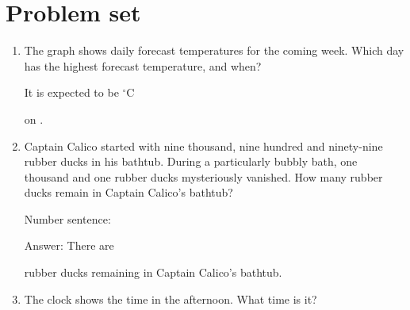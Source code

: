 \documentclass{tufte-book}
\begin{document}
\clearpage\section{Problem set }

\begin{enumerate}
  \item {}
  The graph shows daily forecast temperatures for the coming week.
  Which day has the highest forecast temperature, and when?\medskip
  
  It is expected to be \dotfill$^{\circ}$C\medskip\par
  on \dotfill\medskip.
  
\item
  Captain Calico started with nine thousand, nine hundred and
  ninety-nine rubber ducks in his bathtub. During a particularly bubbly
  bath, one thousand and one rubber ducks mysteriously vanished. How
  many rubber ducks remain in Captain Calico's
  bathtub?\medskip

  Number sentence:
  \dotfill\medskip\par

  Answer: There are
  \dotfill\medskip\par\mbox{}\dotfill\medskip\par\mbox{}\dotfill\bigskip
  rubber ducks remaining in Captain Calico's bathtub.

\item {}
The clock shows the time in the afternoon. What time is it?\medskip


\end{enumerate}
\end{document}
